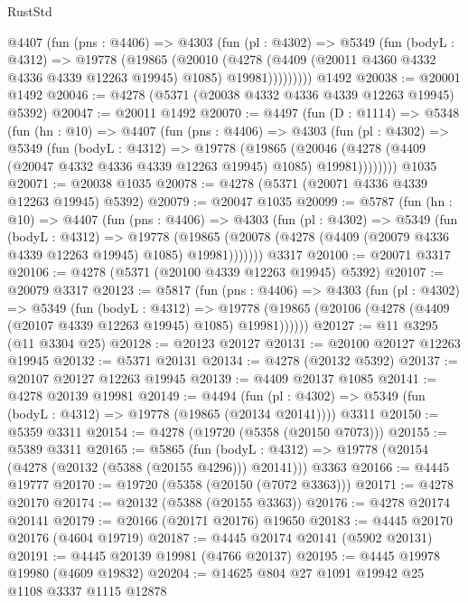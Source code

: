 \begin{lexlean}{RustStd}
\begin{coremodule}
{\begin{coremodule}
{{{{{{{{{{{{{{{{{{{{{{{{{{{{{{{{{{{        @4407
          (fun (pns : @4406) =>
          @4303
            (fun (pl : @4302) =>
            @5349
              (fun (bodyL : @4312) =>
              @19778
                (@19865
                  (@20010
                    (@4278
                      (@4409 (@20011 @4360 @4332 @4336 @4339 @12263 @19945) @1085)
                      @19981)))))))))
    @1492
@20038 := @20001 @1492
@20046 := @4278 (@5371 (@20038 @4332 @4336 @4339 @12263 @19945) @5392)
@20047 := @20011 @1492
@20070 := @4497
    (fun (D : @1114) =>
    @5348
      (fun (hn : @10) =>
      @4407
        (fun (pns : @4406) =>
        @4303
          (fun (pl : @4302) =>
          @5349
            (fun (bodyL : @4312) =>
            @19778
              (@19865
                (@20046 (@4278 (@4409 (@20047 @4332 @4336 @4339 @12263 @19945) @1085) @19981))))))))
    @1035
@20071 := @20038 @1035
@20078 := @4278 (@5371 (@20071 @4336 @4339 @12263 @19945) @5392)
@20079 := @20047 @1035
@20099 := @5787
    (fun (hn : @10) =>
    @4407
      (fun (pns : @4406) =>
      @4303
        (fun (pl : @4302) =>
        @5349
          (fun (bodyL : @4312) =>
          @19778
            (@19865 (@20078 (@4278 (@4409 (@20079 @4336 @4339 @12263 @19945) @1085) @19981)))))))
    @3317
@20100 := @20071 @3317
@20106 := @4278 (@5371 (@20100 @4339 @12263 @19945) @5392)
@20107 := @20079 @3317
@20123 := @5817
    (fun (pns : @4406) =>
    @4303
      (fun (pl : @4302) =>
      @5349
        (fun (bodyL : @4312) =>
        @19778 (@19865 (@20106 (@4278 (@4409 (@20107 @4339 @12263 @19945) @1085) @19981))))))
@20127 := @11 @3295 (@11 @3304 @25)
@20128 := @20123 @20127
@20131 := @20100 @20127 @12263 @19945
@20132 := @5371 @20131
@20134 := @4278 (@20132 @5392)
@20137 := @20107 @20127 @12263 @19945
@20139 := @4409 @20137 @1085
@20141 := @4278 @20139 @19981
@20149 := @4494
    (fun (pl : @4302) => @5349 (fun (bodyL : @4312) => @19778 (@19865 (@20134 @20141))))
    @3311
@20150 := @5359 @3311
@20154 := @4278 (@19720 (@5358 (@20150 @7073)))
@20155 := @5389 @3311
@20165 := @5865
    (fun (bodyL : @4312) => @19778 (@20154 (@4278 (@20132 (@5388 (@20155 @4296))) @20141)))
    @3363
@20166 := @4445 @19777
@20170 := @19720 (@5358 (@20150 (@7072 @3363)))
@20171 := @4278 @20170
@20174 := @20132 (@5388 (@20155 @3363))
@20176 := @4278 @20174 @20141
@20179 := @20166 (@20171 @20176) @19650
@20183 := @4445 @20170 @20176 (@4604 @19719)
@20187 := @4445 @20174 @20141 (@5902 @20131)
@20191 := @4445 @20139 @19981 (@4766 @20137)
@20195 := @4445 @19978 @19980 (@4609 @19832)
@20204 := @14625 @804 @27 @1091 @19942 @25 @1108 @3337 @1115 @12878
}}}}}}}}}}}}}}}}}}}}}}}}}}}}}}}}}}}
\end{coremodule}}
\end{coremodule}
\end{lexlean}
